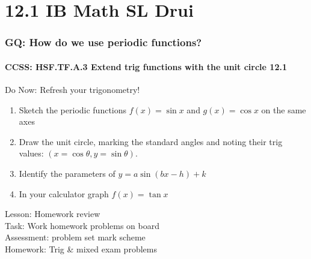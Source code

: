 \documentclass{beamer}
\begin{document}
  \section{12.1 IB Math SL Drui}
  \frame
  {
    \frametitle{GQ: How do we use periodic functions?}
    \framesubtitle{CCSS: HSF.TF.A.3 Extend trig functions with the unit circle \qquad \alert{12.1}}

    \begin{block}{Do Now: Refresh your trigonometry!}
      \begin{enumerate}
      \item Sketch the periodic functions $f(x)=\sin{x}$ and $g(x)=\cos{x}$ on the same axes
      \item Draw the unit circle, marking the standard angles and noting their trig values: $(x=\cos{\theta}, y=\sin{\theta})$.
      \item Identify the parameters of $y=a\sin{(bx-h)}+k$
      \item In your calculator graph $f(x)=\tan{x}$
      \end{enumerate}
   \end{block}
    Lesson: Homework review\\[5pt]
    Task: Work homework problems on board\\%
    Assessment: problem set mark scheme\\%
    Homework: Trig \& mixed exam problems
  }
\end{document}

